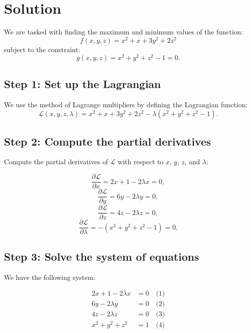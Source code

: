 \documentclass[11pt]{article}
\begin{document}
\newpage

\section{Solution}

We are tasked with finding the maximum and minimum values of the function:
\[
f(x, y, z) = x^2 + x + 3y^2 + 2z^2
\]
subject to the constraint:
\[
g(x, y, z) = x^2 + y^2 + z^2 - 1 = 0.
\]

\newpage

\subsection{Step 1: Set up the Lagrangian}

We use the method of Lagrange multipliers by defining the Lagrangian function:
\[
\mathcal{L}(x, y, z, \lambda) = x^2 + x + 3y^2 + 2z^2 - \lambda (x^2 + y^2 + z^2 - 1).
\]

\newpage

\subsection{Step 2: Compute the partial derivatives}

Compute the partial derivatives of \( \mathcal{L} \) with respect to \( x \), \( y \), \( z \), and \( \lambda \):

\[
\frac{\partial \mathcal{L}}{\partial x} = 2x + 1 - 2\lambda x = 0,
\]
\[
\frac{\partial \mathcal{L}}{\partial y} = 6y - 2\lambda y = 0,
\]
\[
\frac{\partial \mathcal{L}}{\partial z} = 4z - 2\lambda z = 0,
\]
\[
\frac{\partial \mathcal{L}}{\partial \lambda} = -(x^2 + y^2 + z^2 - 1) = 0.
\]

\newpage

\subsection{Step 3: Solve the system of equations}

We have the following system:

\begin{align}
2x + 1 - 2\lambda x &= 0 \quad \text{(1)} \\
6y - 2\lambda y &= 0 \quad \text{(2)} \\
4z - 2\lambda z &= 0 \quad \text{(3)} \\
x^2 + y^2 + z^2 &= 1 \quad \text{(4)}
\end{align}
\end{document}
